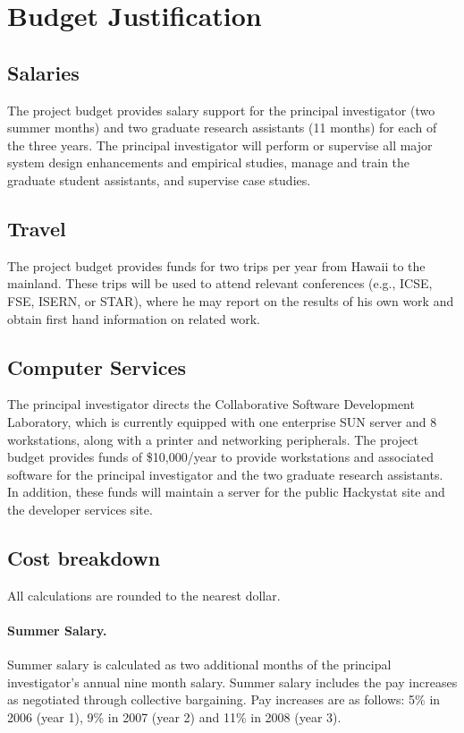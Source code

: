 \documentclass[11pt]{article}
\begin{document}
\pagestyle{empty}
\section*{Budget Justification}

\subsection*{Salaries}

The project budget provides salary support for the principal investigator
(two summer months) and two graduate research
assistants (11 months) for each of the three years.  The principal
investigator will perform or supervise all major system design enhancements
and empirical studies, manage and train the graduate student
assistants, and supervise case studies. 

\subsection*{Travel}

The project budget provides funds for two trips per year from Hawaii to the
mainland.  These trips will be used to attend
relevant conferences (e.g., ICSE, FSE, ISERN, or STAR), where
he may report on the results of his own work and obtain first hand
information on related work. 

\subsection*{Computer Services}

The principal investigator directs the Collaborative Software Development
Laboratory, which is currently equipped with one enterprise SUN server and
8 workstations, along with a printer and networking
peripherals.  The project budget provides funds of \$10,000/year to 
provide workstations and associated software for the principal investigator and 
the two graduate research assistants. In addition, these funds will maintain 
a server for the public Hackystat site and the developer services site. 

\subsection*{Cost breakdown}
\label{cost-breakdown}

All calculations are rounded to the nearest dollar.

\paragraph{Summer Salary.}  
Summer salary is calculated as two additional months of the principal
investigator's annual nine month salary.  Summer salary includes the pay
increases as negotiated through collective bargaining.  Pay increases are
as follows: 5\% in 2006 (year 1), 9\% in 2007 (year 2) and 11\% in 2008
(year 3).
 
\end{document}
